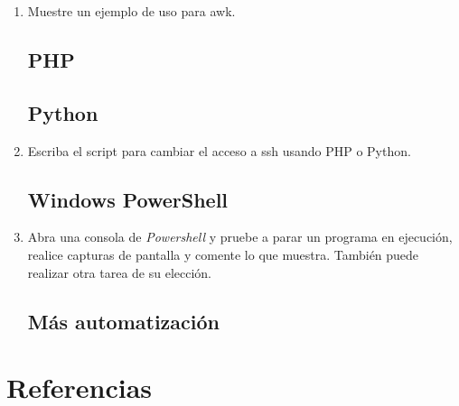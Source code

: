 \documentclass[paper=a4, fontsize=11pt]{scrartcl} %
\numberwithin{equation}{section} %
\numberwithin{figure}{section} %
\numberwithin{table}{section} %
\begin{document}
\begin{enumerate}
		
		\item Muestre un ejemplo de uso para awk.
	
	\subsection{PHP}
	\subsection{Python}
		\item Escriba el script para cambiar el acceso a ssh usando PHP o Python.
	
	\subsection{Windows PowerShell}
		\item Abra una consola de \textit{Powershell} y pruebe a parar un programa en ejecución,
		realice capturas de pantalla y comente lo que muestra. También puede realizar otra tarea de
		su elección.
	
	\subsection{Más automatización}
	
\end{enumerate}

\newpage
\section{Referencias}

\end{document}
